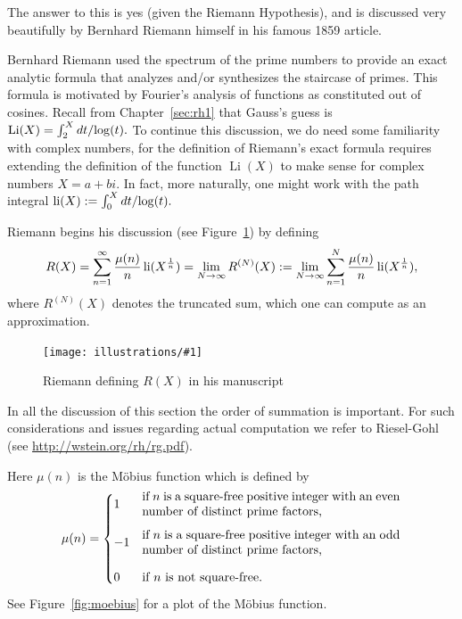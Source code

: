 \documentclass[openany]{book}
\DeclareMathOperator{\Li}{Li}
\DeclareMathOperator{\li}{li}
\newcommand{\ill}[3]{%
   \begin{figure}[H]%
   \vspace{-2ex}
   \centering%
   \texttt{[image: illustrations/\#1]}%
   \caption{#3}%
   \vspace{-2ex}
    \end{figure}}
\theoremstyle{plain}
\theoremstyle{definition}
\newcommand{\RH}{Riemann Hypothesis\index{Riemann Hypothesis}}
\begin{document}
{{  The answer to this is yes (given the \RH{}), and is discussed very
  beautifully by Bernhard Riemann himself in his famous 1859 article.

  Bernhard Riemann used the spectrum of the prime numbers to provide
  an exact analytic formula that analyzes and/or synthesizes the
  staircase of primes.  This formula is motivated by Fourier's
  analysis of functions as constituted out of cosines.
  Recall from Chapter~\ref{sec:rh1} that Gauss's guess is
  $\Li(X)= \int_2^{X}dt/{\rm log}(t).$ To continue this discussion, we do need some familiarity with complex numbers, for the definition of Riemann's exact formula
requires extending
the definition of the function $\Li(X)$ to make sense for
complex numbers $X=a+bi$. In fact, more naturally, one might work with the path integral $\li(X):= \int_0^{X}dt/{\rm log}(t).$

  Riemann  begins his discussion
  (see Figure~\ref{fig:riemann_RX}) by defining
  $$
     R(X) = \sum_{n=1}^{\infty}{\mu(n)\over n} \li(X^{1\over n})= \lim_{N\to \infty} R^{(N)}(X):= \lim_{N\to \infty} \sum_{n=1}^{N}{\mu(n)\over n} \li(X^{1\over n}),
  $$
where  $R^{(N)}(X)$ denotes the truncated sum, which one can compute as an approximation.
\ill{riemann_RX}{1}{Riemann defining $R(X)$ in his manuscript\label{fig:riemann_RX}}
In all the discussion of this section the order of summation is
important. For such considerations and issues regarding actual
computation we refer to Riesel-Gohl (see \url{http://wstein.org/rh/rg.pdf}).

Here $\mu(n)$ is the M\"{o}bius function
 which is defined by
$$
 \mu(n) = \begin{cases}
    1 &
       \mbox{\begin{minipage}{0.6\textwidth}if $n$ is a square-free
       positive integer with an even number of distinct prime
       factors,\end{minipage}}\vspace{1em}\\
    -1& \mbox{\begin{minipage}{0.6\textwidth}if $n$ is a square-free
    positive integer with an odd number of distinct
    prime factors,\end{minipage}}\vspace{1em}\\
    0 & \mbox{if $n$ is not square-free.}
 \end{cases}
 $$
 See Figure~\ref{fig:moebius} for a plot of the M\"{o}bius function.

}}
\end{document}
